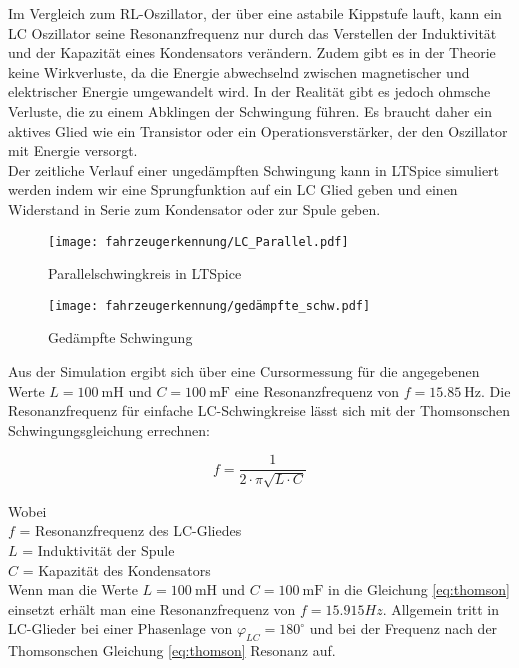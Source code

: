 Im Vergleich zum RL-Oszillator, der über eine astabile Kippstufe lauft, kann ein LC Oszillator seine Resonanzfrequenz nur durch das Verstellen der Induktivität und der Kapazität 
eines Kondensators verändern. Zudem gibt es in der Theorie keine Wirkverluste, da die Energie abwechselnd zwischen magnetischer und elektrischer Energie umgewandelt wird. In der Realität gibt es jedoch
ohmsche Verluste, die zu einem Abklingen der Schwingung führen. Es braucht daher ein aktives Glied wie ein Transistor oder ein Operationsverstärker, der den Oszillator mit Energie versorgt.
\\
Der zeitliche Verlauf einer ungedämpften Schwingung kann in LTSpice simuliert werden indem wir eine Sprungfunktion auf ein LC Glied geben und einen Widerstand in Serie zum Kondensator oder zur
Spule geben.

\begin{figure}[H]
    \centering
    \texttt{[image: fahrzeugerkennung/LC\_Parallel.pdf]}
    \caption{Parallelschwingkreis in LTSpice}
\end{figure}

\begin{figure}[H]
    \centering
    \texttt{[image: fahrzeugerkennung/gedämpfte\_schw.pdf]}
    \caption{Gedämpfte Schwingung}
\end{figure}

Aus der Simulation ergibt sich über eine Cursormessung für die angegebenen Werte $L = \SI{100}{\milli\henry}$ und $C = \SI{100}{\milli\farad}$ eine Resonanzfrequenz von $f = \SI{15,85}{\hertz}$. Die Resonanzfrequenz für einfache LC-Schwingkreise lässt sich mit der
Thomsonschen Schwingungsgleichung errechnen:

\begin{equation} \label{eq:thomson}
    f = \frac{1}{2 \cdot \pi \sqrt{L \cdot C}}
\end{equation}

Wobei \\
$f$ = Resonanzfrequenz des LC-Gliedes\\
$L$ = Induktivität der Spule\\
$C$ = Kapazität des Kondensators\\

Wenn man die Werte $L = \SI{100}{\milli\henry}$ und $C = \SI{100}{\milli\farad}$ in die Gleichung \ref{eq:thomson} einsetzt erhält man eine Resonanzfrequenz von $f = 15.915Hz$.
Allgemein tritt in LC-Glieder bei einer Phasenlage von $\varphi_{LC} = 180^{\circ}$ und bei der Frequenz nach der Thomsonschen Gleichung \ref{eq:thomson}  Resonanz auf. 

